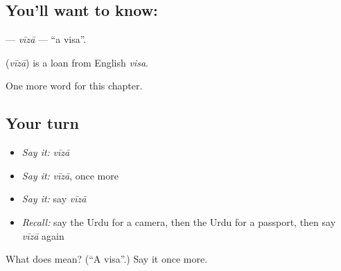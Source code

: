 \subsection*{You'll want to know: }
\textbf{} — \emph{vīzā} — \textquotedblleft{}a visa\textquotedblright{}.

\begin{cousinweb}
\textbf{} (\emph{vīzā}) is a loan from English \emph{visa}.
\end{cousinweb}

\begin{grammarlens}[title={What you've built}]
One more word for this chapter.
\end{grammarlens}

\subsection*{Your turn}
\begin{itemize}
\raggedright
  \item \emph{Say it:} \emph{vīzā}
  \item \emph{Say it:} \emph{vīzā}, once more
  \item \emph{Say it:} say \emph{vīzā}
  \item \emph{Recall:} say the Urdu for a camera, then the Urdu for a passport, then say \emph{vīzā} again
\end{itemize}

\begin{tcolorbox}[breakable,colback=teal!4,colframe=teal!35!black,title={Before you move on}]
What does  mean? (\textquotedblleft{}A visa\textquotedblright{}.) Say it once more.
\end{tcolorbox}
